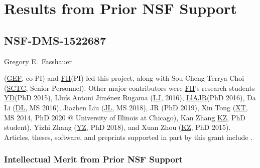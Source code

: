 \documentclass[11pt]{NSFamsart}
\newcommand{\FH}{\hyperlink{FHlink}{FH}\xspace}
\newcommand{\SCTC}{\hyperlink{SCTClink}{SCTC}\xspace}
\newcommand{\GEF}{\hyperlink{GEFlink}{GEF}\xspace}
\newcommand{\YD}{\hyperlink{YDlink}{YD}\xspace}
\newcommand{\LlAJR}{\hyperlink{LlAJRlink}{LlAJR}\xspace}
\newcommand{\LJ}{\hyperlink{LJlink}{LJ}\xspace}
\newcommand{\XT}{\hyperlink{XTlink}{XT}\xspace}
\newcommand{\KZ}{\hyperlink{KZlink}{KZ}\xspace}
\newcommand{\DL}{\hyperlink{DLlink}{DL}\xspace}
\newcommand{\XZ}{\hyperlink{XZlink}{KZ}\xspace}
\newcommand{\JL}{\hyperlink{JLlink}{JL}\xspace}
\newcommand{\YZ}{\hyperlink{YZlink}{YZ}\xspace}
\begin{document}
\section{Results from Prior NSF Support} \label{sec:prior_work}

\subsection{NSF-DMS-1522687
} \label{sec:PreviousFred}

\hypertarget{GEFlink}{Gregory E.\ Fasshauer} (\GEF, co-PI) and \FH (PI) led this project, along with  \hypertarget{SCTClink}{Sou-Cheng Terrya Choi} (\SCTC, Senior Personnel).  Other major contributors were \FH's research students  \YD (PhD 2015), \hypertarget{LlAJRlink}{Llu\'is Antoni Jim\'enez Rugama} (\LJ, 2016),
\LlAJR (PhD 2016), \hypertarget{DLlink}{Da Li} (\DL, MS 2016), \hypertarget{JLlink}{Jiazhen Liu} (\JL, MS 2018), JR (PhD 2019), \hypertarget{XTlink}{Xin Tong} (\XT, MS 2014, PhD 2020 @ University of Illinois at Chicago), \hypertarget{KZlink}{Kan Zhang} \KZ, PhD student), \hypertarget{YZlink}{Yizhi Zhang} (\YZ, PhD 2018), and \hypertarget{XZlink}{Xuan Zhou} (\XZ, PhD 2015).  Articles, theses,
software, and preprints supported in
part by this
grant
include
\cite{ala_augmented_2017,
	ChoEtal17a,
	ChoEtal20a,
	Din15a,
	DinHic20a,
	GilEtal16a,
	Hic17a,
	HicJag18b,
	HicJim16a,
	HicEtal18a,
	HicEtal17a,
	HicKriWoz19a,
	RatHic19a,
	GilJim16b,
	JimHic16a,
	JohFasHic18a,
	Li16a,
	Liu17a,
	MarEtal18a,
	mccourt_stable_2017,
	MCCEtal19a,
	mishra_hybrid_2018,
	MisEtal19a,
	rashidinia_stable_2016,
	rashidinia_stable_2018,
	Zha18a,
	Zha17a,
	Zho15a,
	ZhoHic15a}.

\subsubsection{Intellectual Merit from Prior NSF Support}
\label{previousmeritsubsec}
\phantom{a}
\end{document}
